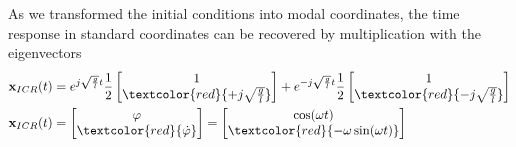 \begin{examplesection}
    As we transformed the initial conditions into modal coordinates, the time response in standard coordinates can be recovered by multiplication with the eigenvectors
    \begin{align*}
        \mathbf{x}_{ICR}(t) & = e^{j\sqrt{\frac{g}{l}}t}\frac{1}{2}
        \begin{bmatrix}
            1 \\
            \textcolor{red}{+j \sqrt{\frac{g}{l}}}
        \end{bmatrix} + e^{-j\sqrt{\frac{g}{l}}t}\frac{1}{2}
        \begin{bmatrix}
            1 \\
            \textcolor{red}{-j \sqrt{\frac{g}{l}}}
        \end{bmatrix}                      \\
        \mathbf{x}_{ICR}(t) & = \begin{bmatrix}
                                    \varphi \\
                                    \textcolor{red}{\dot{\varphi}}
                                \end{bmatrix}
        = \begin{bmatrix}
              \cos(\omega t) \\
              \textcolor{red}{-\omega\sin(\omega t)}
          \end{bmatrix}
    \end{align*}    
\end{examplesection}
